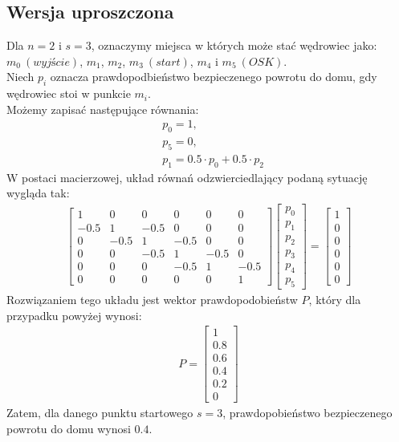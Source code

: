 \documentclass[titlepage]{article}
\begin{document}
\subsection{Wersja uproszczona}
Dla $n = 2$ i $s = 3$, oznaczymy miejsca w których może stać wędrowiec jako: $m_0\ (wyjście)$, $m_1$, $m_2$, $m_3\ (start)$, $m_4$ i $m_5\ (OSK)$.\\
Niech $p_i$ oznacza prawdopodbieństwo bezpieczenego powrotu do domu, gdy wędrowiec stoi w punkcie $m_i$.\\
Możemy zapisać następujące równania:
\begin{align}
&p_0 = 1,\\
&p_5 = 0,\\
&p_1 = 0.5\cdot p_0 + 0.5 \cdot p_2
\end{align}
W postaci macierzowej, układ równań odzwierciedlający podaną sytuację wygląda tak:
\begin{align}\label{eq4}
\begin{bmatrix}
1 & 0 & 0 & 0 & 0 & 0 \\
-0.5 & 1 & -0.5 & 0 & 0 & 0 \\
0 & -0.5 & 1 & -0.5 & 0 & 0 \\
0 & 0 & -0.5 & 1 & -0.5 & 0 \\
0 & 0 & 0 & -0.5 & 1 & -0.5 \\
0 & 0 & 0 & 0 & 0 & 1 
\end{bmatrix}
\begin{bmatrix}
p_0\\
p_1\\
p_2\\
p_3\\
p_4\\
p_5
\end{bmatrix}
=
\begin{bmatrix}
1\\
0\\
0\\
0\\
0\\
0
\end{bmatrix}
\end{align}
Rozwiązaniem tego układu jest wektor prawdopodobieństw $P$, który dla przypadku powyżej wynosi:
\begin{align}
P=
\begin{bmatrix}
1\\
0.8\\
0.6\\
0.4\\
0.2\\
0
\end{bmatrix}
\end{align}
Zatem, dla danego punktu startowego $s=3$, prawdopobieństwo bezpieczenego powrotu do domu wynosi $0.4$.
\newpage
\end{document}
